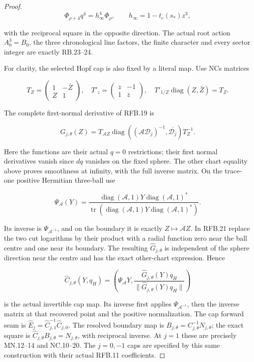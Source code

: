 \begin{proof}
\[
                 \Phi_{\rho+4}q^4=h_\infty^4\Phi_\rho,
 \qquad h_\infty=1-t_c(s_*)z^3,
 \tag{RFB.20}
\]

with the reciprocal square in the opposite direction. The actual
root action \(A_0^3=B_0\), the three chronological line factors,
the finite character and every sector integer are exactly RB.23--24.

For clarity, the selected Hopf cap is also fixed by a literal map.
Use NC\textquotesingle s matrices

\[
 T_Z=\begin{pmatrix}1&-\bar Z\\Z&1\end{pmatrix},\quad
 T'_z=\begin{pmatrix}z&-1\\1&\bar z\end{pmatrix},\quad
 T'_{1/Z}\operatorname{diag}(Z,\bar Z)=T_Z.
\]

The complete first-normal derivative of RFB.19 is

\[
 G_{j,\theta}(Z)=T_{\mathcal AZ}
 \operatorname{diag}((\mathcal A\mathcal D_j)^{-1},
                                  \overline{\mathcal D_j})T_Z^{-1}.
 \tag{RFB.21}
\]

Here the functions are their actual \(q=0\) restrictions; their
first normal derivatives vanish since \(dq\) vanishes on the
fixed sphere. The other chart equality above proves smoothness
at infinity, with the full inverse matrix. On the trace-one
positive Hermitian three-ball use

\[
 \Psi_{\mathcal A}(Y)=
 \frac{\operatorname{diag}(\mathcal A,1)Y
       \operatorname{diag}(\mathcal A,1)^*}
      {\operatorname{tr}(\operatorname{diag}(\mathcal A,1)Y
       \operatorname{diag}(\mathcal A,1)^*)}.
 \tag{RFB.22}
\]

Its inverse is \(\Psi_{\mathcal A^{-1}}\), and on the boundary
it is exactly \(Z\mapsto\mathcal AZ\). In RFB.21 replace the two
cut logarithms by their product with a radial function zero near
the ball centre and one near its boundary. The resulting
\(\widehat G_{j,\theta}\) is independent of the sphere direction
near the centre and has the exact other-chart expression. Hence

\[
 \widehat C_{j,\theta}(Y,q_H)=
 \left(\Psi_{\mathcal A}Y,
 \frac{\widehat G_{j,\theta}(Y)q_H}
      {\|\widehat G_{j,\theta}(Y)q_H\|}\right)
 \tag{RFB.23}
\]

is the actual invertible cap map. Its inverse first applies
\(\Psi_{\mathcal A^{-1}}\), then the inverse matrix at that recovered
point and the positive normalization. The cap forward seam is
\(\widehat E_j=\widehat C_{j,1}^{-1}\widehat C_{j,0}\).
The resolved boundary map is \(B_{j,\theta}=C_{j,\theta}^{-1}N_{j,\theta}\);
the exact square is \(\widehat C_{j,\theta}B_{j,\theta}=N_{j,\theta}\),
with reciprocal inverse. At \(j=1\) these are precisely MN.12--14
and NC.10--20. The \(j=0,-1\) caps are specified by this same
construction with their actual RFB.11 coefficients.


\end{proof}
